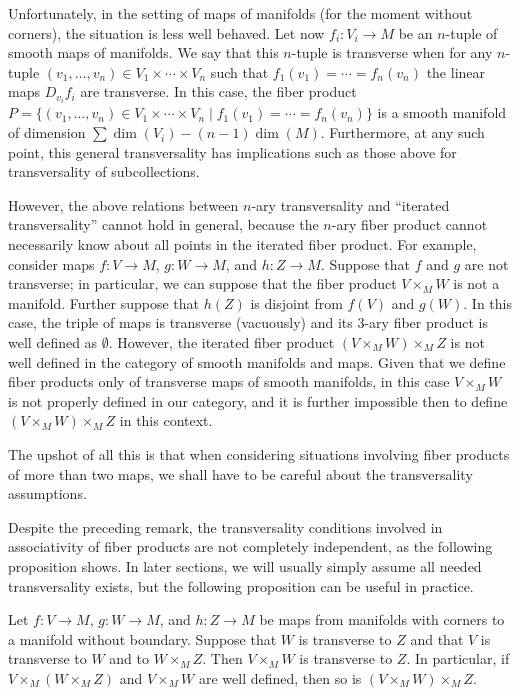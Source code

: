 \begin{remark}
	Unfortunately, in the setting of maps of manifolds (for the moment without corners), the situation is less well behaved.
	Let now $f_i \colon V_i \to M$ be an $n$-tuple of smooth maps of manifolds.
	We say that this $n$-tuple is transverse when for any $n$-tuple $(v_1,\ldots, v_n) \in V_1 \times \cdots \times V_n$ such that $f_1(v_1) = \cdots = f_n(v_n)$ the linear maps $D_{v_i}f_i$ are transverse.
	In this case, the fiber product $P = \{(v_1,\ldots, v_n) \in V_1 \times \cdots \times V_n \mid f_1(v_1) = \cdots = f_n(v_n)\}$ is a smooth manifold of dimension $\sum\dim(V_i)-(n-1)\dim(M)$.
	Furthermore, at any such point, this general transversality has implications such as those above for transversality of subcollections.

	However, the above relations between $n$-ary transversality and ``iterated transversality'' cannot hold in general, because the $n$-ary fiber product cannot necessarily know about all points in the iterated fiber product.
	For example, consider maps $f \colon V \to M$, $g \colon W \to M$, and $h \colon Z \to M$.
	Suppose that $f$ and $g$ are not transverse; in particular, we can suppose that the fiber product $V \times _MW$ is not a manifold.
	Further suppose that $h(Z)$ is disjoint from $f(V)$ and $g(W)$.
	In this case, the triple of maps is transverse (vacuously) and its 3-ary fiber product is well defined as $\emptyset$.
	However, the iterated fiber product $(V \times _MW) \times _M Z$ is not well defined in the category of smooth manifolds and maps.
	Given that we define fiber products only of transverse maps of smooth manifolds, in this case $V \times _M W$ is not properly defined in our category, and it is further impossible then to define $(V \times _MW) \times _M Z$ in this context.

	The upshot of all this is that when considering situations involving fiber products of more than two maps, we shall have to be careful about the transversality assumptions.
\end{remark}

Despite the preceding remark, the transversality conditions involved in associativity of fiber products are not completely independent, as the following proposition shows. In later sections, we will usually simply assume all needed transversality exists, but the following proposition can be useful in practice.

\begin{proposition}\label{P: 3 out of 4 trans}
	Let $f \colon V \to M$, $g \colon W \to M$, and $h \colon Z \to M$ be maps from manifolds with corners to a manifold without boundary. Suppose that $W$ is transverse to $Z$ and that $V$ is transverse to $W$ and to $W \times _MZ$. Then $V \times _MW$ is transverse to $Z$. In particular, if $V \times _M(W \times _MZ)$ and $V \times _MW$ are well defined, then so is $(V \times _MW) \times _M Z$.
\end{proposition}

